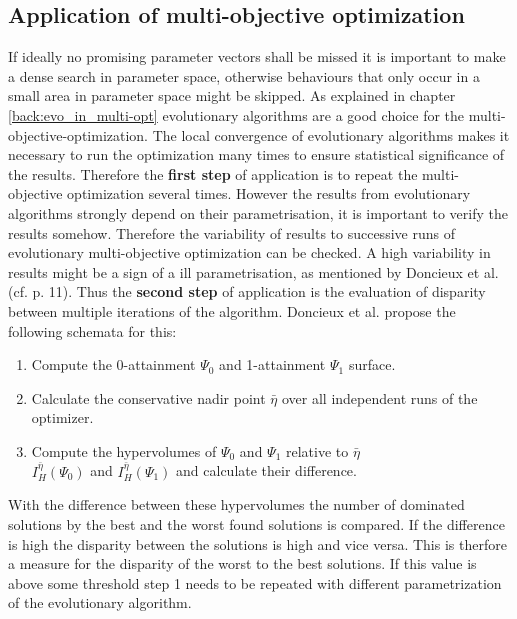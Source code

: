 \documentclass[12pt,twoside]{article}
\theoremstyle{plain}
\theoremstyle{definition}
\theoremstyle{remark}
\begin{document}
\subsection{Application of multi-objective optimization}
If ideally no promising parameter vectors shall be missed it is important to make a dense search in parameter space, otherwise behaviours that only occur in a small area in parameter space might be skipped.
As explained in chapter \ref{back:evo_in_multi-opt} evolutionary algorithms are a good choice for the multi-objective-optimization.
The local convergence of evolutionary algorithms makes it necessary to run the optimization many times to ensure statistical significance of the results. Therefore the \textbf{first step} of application is to repeat the multi-objective optimization several times.
However the results from evolutionary algorithms strongly depend on their parametrisation, it is important to verify the results somehow.
Therefore the variability of results to successive runs of evolutionary multi-objective optimization can be checked.
A high variability in results might be a sign of a ill parametrisation, as mentioned by Doncieux et al. (cf. \cite{doncieux2015multi} p. 11).
Thus the \textbf{second step} of application is the evaluation of disparity between multiple iterations of the algorithm. Doncieux et al. propose the following schemata for this:
\begin{enumerate}
	\item Compute the 0-attainment $\Psi_0$ and 1-attainment $\Psi_1$ surface.
	\item Calculate the conservative nadir point $\bar{\eta}$ over all independent runs of the optimizer.
	\item Compute the hypervolumes of $\Psi_0$ and $\Psi_1$ relative to $\bar{\eta}$\\ $I^{\bar{\eta}}_H(\Psi_0)$ and $I^{\bar{\eta}}_H(\Psi_1)$ and calculate their difference.
\end{enumerate}
With the difference between these hypervolumes the number of dominated solutions by the best and the worst found solutions is compared. If the difference is high the disparity between the solutions is high and vice versa. This is therfore a measure for the disparity of the worst to the best solutions. If this value is above some threshold step 1 needs to be repeated with different parametrization of the evolutionary algorithm.\\
\end{document}
